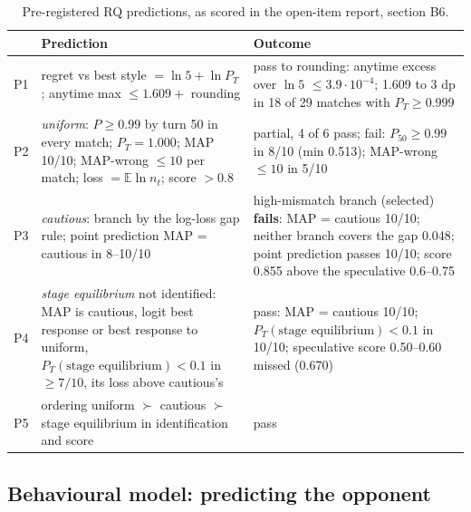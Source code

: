 \documentclass[10pt]{article}
\theoremstyle{plain}
\theoremstyle{definition}
\theoremstyle{remark}
\newcommand{\E}{\mathbb{E}}
\begin{document}
\begin{table}[!htbp]\centering\small
\caption{Pre-registered RQ predictions, as scored in the open-item report, section B6.}\label{tab:prereg}
\begin{tabular}{@{}lp{6.2cm}p{7.6cm}@{}}\toprule
 & Prediction & Outcome \\ \midrule
P1 & regret vs best style $=\ln5+\ln P_T$; anytime max $\le1.609+$ rounding & pass to rounding: anytime excess over $\ln5$ $\le3.9\cdot10^{-4}$; 1.609 to 3 dp in 18 of 29 matches with $P_T\ge0.999$ \\
P2 & \emph{uniform}: $P\ge0.99$ by turn 50 in every match; $P_T=1.000$; MAP 10/10; MAP-wrong $\le10$ per match; loss $=\E\ln n_t$; score $>0.8$ & partial, 4 of 6 pass; fail: $P_{50}\ge0.99$ in 8/10 (min 0.513); MAP-wrong $\le10$ in 5/10 \\
P3 & \emph{cautious}: branch by the log-loss gap rule; point prediction MAP = cautious in 8--10/10 & high-mismatch branch (selected) \textbf{fails}: MAP = cautious 10/10; neither branch covers the gap 0.048; point prediction passes 10/10; score 0.855 above the speculative 0.6--0.75 \\
P4 & \emph{stage equilibrium} not identified: MAP is cautious, logit best response or best response to uniform, $P_T(\text{stage equilibrium})<0.1$ in $\ge7/10$, its loss above cautious's & pass: MAP = cautious 10/10; $P_T(\text{stage equilibrium})<0.1$ in 10/10; speculative score 0.50--0.60 missed (0.670) \\
P5 & ordering uniform $\succ$ cautious $\succ$ stage equilibrium in identification and score & pass \\ \bottomrule
\end{tabular}\end{table}

\subsection{Behavioural model: predicting the opponent}\label{sec:behav}
\end{document}
